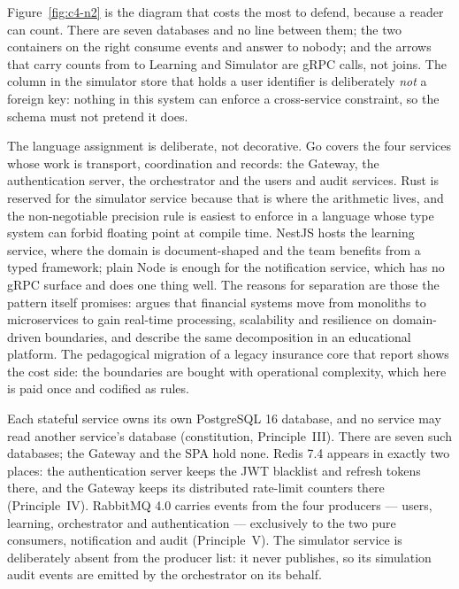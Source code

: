 Figure~\ref{fig:c4-n2} is the diagram that costs the most to defend, because a reader
can count. There are seven databases and no line between them; the two containers on
the right consume events and answer to nobody; and the arrows that carry counts from
 to Learning and Simulator are gRPC calls, not joins. The column in the
simulator store that holds a user identifier is deliberately \emph{not} a foreign key:
nothing in this system can enforce a cross-service constraint, so the schema must not
pretend it does.

The language assignment is deliberate, not decorative. Go covers the four
services whose work is transport, coordination and records: the Gateway, the
authentication server, the orchestrator and the users and audit services. Rust is
reserved for the simulator service because that is where the arithmetic lives, and
the non-negotiable precision rule is easiest to enforce in a language whose type
system can forbid floating point at compile time. NestJS hosts the learning
service, where the domain is document-shaped and the team benefits from a typed
framework; plain Node is enough for the notification service, which has no gRPC
surface and does one thing well. The reasons for separation are those the pattern
itself promises: \textcite{dhandapani2025microservices} argues that financial
systems move from monoliths to microservices to gain real-time processing,
scalability and resilience on domain-driven boundaries, and
\parencite{miao2020microservice} describe the same decomposition in an
educational platform. The pedagogical migration of a legacy insurance core that
\textcite{lange2019microservices} report shows the cost side: the boundaries are
bought with operational complexity, which here is paid once and codified as rules.

Each stateful service owns its own PostgreSQL 16 database, and no service may
read another service's database (constitution, Principle~III). There are seven
such databases; the Gateway and the SPA hold none. Redis 7.4 appears in exactly
two places: the authentication server keeps the JWT blacklist and refresh tokens
there, and the Gateway keeps its distributed rate-limit counters there
(Principle~IV). RabbitMQ 4.0 carries events from the four producers --- users,
learning, orchestrator and authentication --- exclusively to the two pure
consumers, notification and audit (Principle~V). The simulator service is
deliberately absent from the producer list: it never publishes, so its
simulation audit events are emitted by the orchestrator on its behalf.

